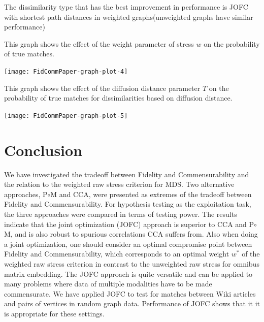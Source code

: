 \documentclass[11pt]{article} %
\begin{document}
The dissimilarity type that has the best improvement in performance is JOFC with shortest path distances in weighted graphs(unweighted graphs have similar performance)



This graph shows the effect of the weight parameter of stress $w$ on the probability of true matches.

\texttt{[image: FidCommPaper-graph-plot-4]}


This graph shows the effect of the diffusion distance parameter $T$ on the probability of true matches for dissimilarities based on diffusion distance.


\texttt{[image: FidCommPaper-graph-plot-5]}





\section{Conclusion}
 We have investigated the tradeoff between Fidelity and Commensurability and the relation to the weighted raw stress criterion for MDS.
  Two alternative approaches, P$\circ$M and CCA, were presented as extremes of the tradeoff  between Fidelity and Commensurability.
   For  hypothesis testing as the exploitation task, the three approaches were compared in terms of testing power.
    The results indicate that the joint optimization (JOFC) approach is superior to CCA and  P$\circ$M,
     and is also robust to spurious correlations CCA suffers from.
      Also when doing a joint optimization, one should consider an optimal compromise point between Fidelity and Commensurability,
       which corresponds to an optimal weight $w^*$ of the weighted raw stress criterion in contrast to the unweighted raw stress 
        for omnibus matrix embedding. 
        The JOFC approach is quite versatile and can be applied to many problems where data of multiple modalities have to be made commensurate. 
        We have applied JOFC to  test for matches between Wiki articles and pairs of vertices in random graph data.  Performance of JOFC shows that it 
        it is appropriate for these settings.  





\end{document}
